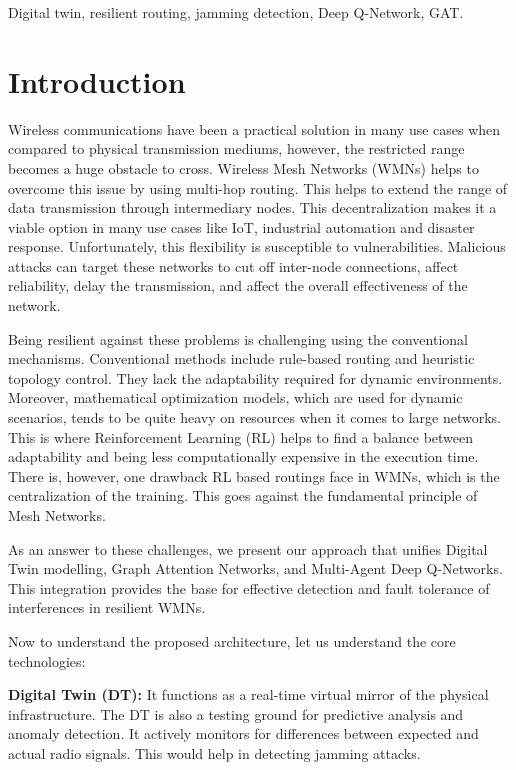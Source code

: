 \documentclass[conference]{IEEEtran}
\begin{document}
\begin{IEEEkeywords}
Digital twin, resilient routing, jamming detection, Deep Q-Network, GAT.
\end{IEEEkeywords}

\section{Introduction}

Wireless communications have been a practical solution in many use cases when compared to physical transmission mediums, however, the restricted range becomes a huge obstacle to cross. Wireless Mesh Networks (WMNs) helps to overcome this issue by using multi-hop routing. This helps to extend the range of data transmission through intermediary nodes. This decentralization makes it a viable option in many use cases like IoT, industrial automation and disaster response. Unfortunately, this flexibility is susceptible to vulnerabilities. Malicious attacks can target these networks to cut off inter-node connections, affect reliability, delay the transmission, and affect the overall effectiveness of the network.

Being resilient against these problems is challenging using the conventional mechanisms. Conventional methods include rule-based routing and heuristic topology control. They lack the adaptability required for dynamic environments. Moreover, mathematical optimization models, which are used for dynamic scenarios, tends to be quite heavy on resources when it comes to large networks. This is where Reinforcement Learning (RL) helps to find a balance between adaptability and being less computationally expensive in the execution time. There is, however, one drawback RL based routings face in WMNs, which is the centralization of the training. This goes against the fundamental principle of Mesh Networks.

As an answer to these challenges, we present our approach that unifies Digital Twin modelling, Graph Attention Networks, and Multi-Agent Deep Q-Networks. This integration provides the base for effective detection and fault tolerance of interferences in resilient WMNs.

Now to understand the proposed architecture, let us understand the core technologies:

\textbf{Digital Twin (DT):} It functions as a real-time virtual mirror of the physical infrastructure. The DT is also a testing ground for predictive analysis and anomaly detection. It actively monitors for differences between expected and actual radio signals. This would help in detecting jamming attacks.
\end{document}
